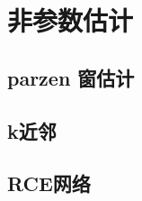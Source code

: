 \chapter{非参数估计} %
\label{cha:非参数估计}
\section{parzen 窗估计} %
\label{sec:parzen_窗估计}


\section{k近邻} %
\label{sec:k近邻}


\section{RCE网络} %
\label{sec:rce网络}


